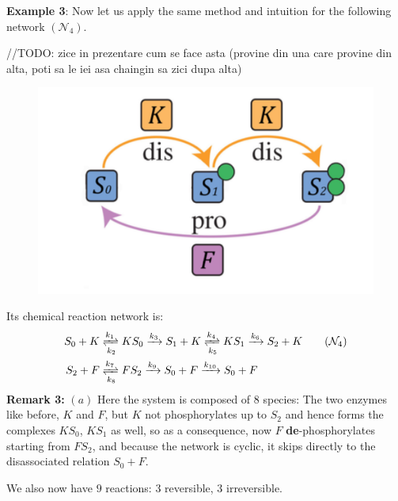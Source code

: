 \hfill\break
\hfill\break

\textbf{Example 3}:
Now let us apply the same method and intuition for the following network $(\mathcal{N}_4)$.

\hfill\break
//TODO: zice in prezentare cum se face asta (provine din una care provine din alta, poti sa le iei asa chaingin sa zici dupa alta)
\hfill\break

\begin{figure}[H]
	\includegraphics[width=13cm]{math_pics/ex3-bifurcations.png}
	\centering
\end{figure}
Its chemical reaction network is:
\begin{align}\label{network3}
	S_0+K &\xrightleftharpoons[k_2]{k_1} KS_0 \xrightarrow{k_3} S_1 + K \xrightleftharpoons[k_5]{k_4} KS_1 \xrightarrow{k_6} S_2 + K \tag{$\mathcal{N}_4$}
	\\
	S_2+F &\xrightleftharpoons[k_8]{k_7} FS_2 \xrightarrow{k_9} S_0 + F \notag \xrightarrow{k_{10}} S_0 + F
\end{align}
\textbf{Remark 3:} $(a)$ Here the system is composed of $8$ species: The two enzymes like before, $K$ and $F$, but $K$ not phosphorylates up to $S_2$ and hence forms the complexes $KS_0$, $KS_1$ as well, so as a consequence, now $F$ \textbf{de}-phosphorylates starting from $FS_2$, and because the network is cyclic, it skips directly to the disassociated relation $S_0 + F$.

We also now have $9$ reactions: $3$ reversible, $3$ irreversible.

